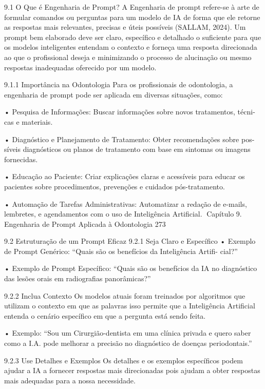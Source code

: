 9.1     O Que é Engenharia de Prompt?
A Engenharia de prompt refere-se à arte de formular comandos ou perguntas para um
modelo de IA de forma que ele retorne as respostas mais relevantes, precisas e úteis
possíveis (SALLAM, 2024). Um prompt bem elaborado deve ser claro, específico e
detalhado o suficiente para que os modelos inteligentes entendam o contexto e forneça
uma resposta direcionada ao que o profissional deseja e minimizando o processo de
alucinação ou mesmo respostas inadequadas oferecido por um modelo.

9.1.1   Importância na Odontologia
Para os profissionais de odontologia, a engenharia de prompt pode ser aplicada em
diversas situações, como:

   • Pesquisa de Informações: Buscar informações sobre novos tratamentos, técni-
     cas e materiais.

   • Diagnóstico e Planejamento de Tratamento: Obter recomendações sobre pos-
     síveis diagnósticos ou planos de tratamento com base em sintomas ou imagens
     fornecidas.

   • Educação ao Paciente: Criar explicações claras e acessíveis para educar os
     pacientes sobre procedimentos, prevenções e cuidados pós-tratamento.

   • Automação de Tarefas Administrativas: Automatizar a redação de e-mails,
     lembretes, e agendamentos com o uso de Inteligência Artificial.
Capítulo 9. Engenharia de Prompt Aplicada à Odontologia                            273


9.2     Estruturação de um Prompt Eficaz
9.2.1    Seja Claro e Específico
    • Exemplo de Prompt Genérico: “Quais são os benefícios da Inteligência Artifi-
      cial?”

    • Exemplo de Prompt Específico: “Quais são os benefícios da IA no diagnóstico
      das lesões orais em radiografias panorâmicas?”

9.2.2    Inclua Contexto
Os modelos atuais foram treinados por algoritmos que utilizam o contexto em que as
palavras isso permite que a Inteligência Artificial entenda o cenário específico em que
a pergunta está sendo feita.

    • Exemplo: “Sou um Cirurgião-dentista em uma clínica privada e quero saber como
      a I.A. pode melhorar a precisão no diagnóstico de doenças periodontais.”

9.2.3    Use Detalhes e Exemplos
Os detalhes e os exemplos específicos podem ajudar a IA a fornecer respostas mais
direcionadas pois ajudam a obter respostas mais adequadas para a nossa necessidade.


